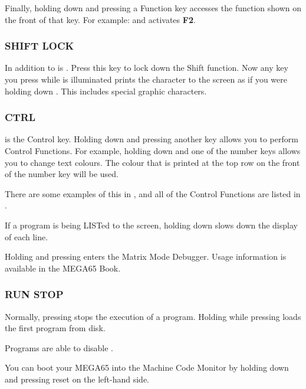 Finally, holding  down and pressing a Function key accesses the function shown on the front of that key. For example:  and  activates \textbf{F2}.


\subsubsection{SHIFT LOCK}

In addition to  is . Press this key to lock down the Shift function. Now any key you press while  is illuminated prints the character to the screen as if you were holding down . This includes special graphic characters.

\subsubsection{CTRL}

 is the Control key. Holding down  and pressing another key allows you to perform Control Functions. For example, holding down  and one of the number keys allows you to change text colours. The colour that is printed at the top row on the front of the number key will be used.

There are some examples of this in , and all of the Control Functions are listed in .

If a program is being LISTed to the screen, holding down  slows down the display of each line.

Holding  and pressing \megakey{*} enters the Matrix Mode Debugger. Usage information is available in the MEGA65 Book.

\subsubsection{RUN STOP}

Normally, pressing  stops the execution of a program. Holding  while pressing  loads the first program from disk.

Programs are able to disable .

You can boot your MEGA65 into the Machine Code Monitor by holding down  and pressing reset on the left-hand side.

